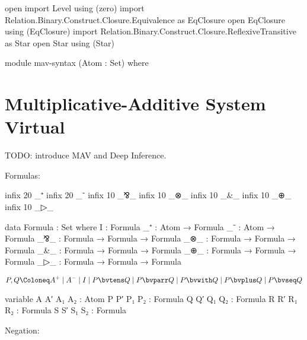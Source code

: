 \begin{code}[hide]
  open import Level using (zero)
  import Relation.Binary.Construct.Closure.Equivalence as EqClosure
  open EqClosure using (EqClosure)
  import Relation.Binary.Construct.Closure.ReflexiveTransitive as Star
  open Star using (Star)
\end{code}
\begin{code}[hide]
  module mav-syntax (Atom : Set) where
\end{code}
\section{Multiplicative-Additive System Virtual}\label{sec:mav-syntax}

TODO: introduce MAV and Deep Inference.

Formulas:
\begin{code}[hide]
  infix 20 _⁺
  infix 20 _⁻
  infix 10 _⅋_
  infix 10 _⊗_
  infix 10 _&_
  infix 10 _⊕_
  infix 10 _▷_
\end{code}

\begin{code}
  data Formula : Set where
    I    : Formula
    _⁺   : Atom → Formula
    _⁻   : Atom → Formula
    _⅋_  : Formula → Formula → Formula
    _⊗_  : Formula → Formula → Formula
    _&_  : Formula → Formula → Formula
    _⊕_  : Formula → Formula → Formula
    _▷_  : Formula → Formula → Formula
\end{code}

\begin{displaymath}
  P, Q
  \Coloneq A^{+}
  \mid     A^{-}
  \mid     I
  \mid     P \bvtens Q
  \mid     P \bvparr Q
  \mid     P \bvwith Q
  \mid     P \bvplus Q
  \mid     P \bvseq  Q
\end{displaymath}

\begin{code}[hide]
  variable
    A A′ A₁ A₂ : Atom
    P P′ P₁ P₂ : Formula
    Q Q′ Q₁ Q₂ : Formula
    R R′ R₁ R₂ : Formula
    S S′ S₁ S₂ : Formula
\end{code}

Negation:

